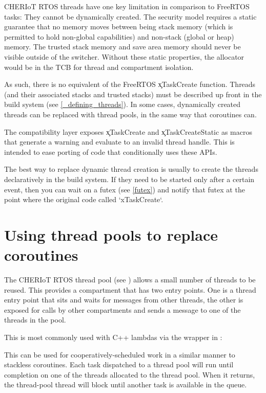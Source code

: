 CHERIoT RTOS threads have one key limitation in comparison to FreeRTOS tasks:
They cannot be dynamically created.
The security model requires a static guarantee that no memory moves between being stack memory (which is permitted to hold non-global capabilities) and non-stack (global or heap) memory.
The trusted stack memory and save area memory should never be visible outside of the switcher.
Without these static properties, the allocator would be in the TCB for thread and compartment isolation.

As such, there is no equivalent of the FreeRTOS \c{xTaskCreate} function.
Threads (and their associated stacks and trusted stacks) must be described up front in the build system (see \ref{_defining_threads}).
In some cases, dynamically created threads can be replaced with thread pools, in the same way that coroutines can.

The compatibility layer exposes \c{xTaskCreate} and \c{xTaskCreateStatic} as macros that generate a warning and evaluate to an invalid thread handle.
This is intended to ease porting of code that conditionally uses these APIs.

The best way to replace dynamic thread creation is usually to create the threads declaratively in the build system.
If they need to be started only after a certain event, then you can wait on a futex (see \ref{futex}) and notify that futex at the point where the original code called `xTaskCreate`.

\section{Using thread pools to replace coroutines}

The CHERIoT RTOS thread pool (see ) allows a small number of threads to be reused.
This provides a compartment that has two entry points.
One is a thread entry point that sits and waits for messages from other threads, the other is exposed for calls by other compartments and sends a message to one of the threads in the pool.

This is most commonly used with C++ lambdas via the  wrapper in :

\begin{cxxsnippet}
async([]() {
	// This runs in the caller's compartment but in another thread.
\})
\end{cxxsnippet}

This can be used for cooperatively-scheduled work in a similar manner to stackless coroutines.
Each task dispatched to a thread pool will run until completion on one of the threads allocated to the thread pool.
When it returns, the thread-pool thread will block until another task is available in the queue.

